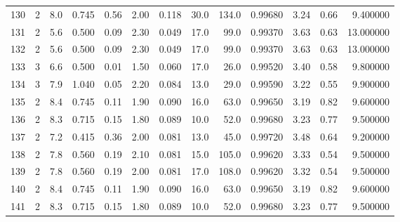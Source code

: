 \begin{tabular}{lrrrrrrrrrrrr}
130  &        2 &            8.0 &             0.745 &         0.56 &            2.00 &      0.118 &                 30.0 &                 134.0 &  0.99680 &  3.24 &       0.66 &   9.400000 \\
131  &        2 &            5.6 &             0.500 &         0.09 &            2.30 &      0.049 &                 17.0 &                  99.0 &  0.99370 &  3.63 &       0.63 &  13.000000 \\
132  &        2 &            5.6 &             0.500 &         0.09 &            2.30 &      0.049 &                 17.0 &                  99.0 &  0.99370 &  3.63 &       0.63 &  13.000000 \\
133  &        3 &            6.6 &             0.500 &         0.01 &            1.50 &      0.060 &                 17.0 &                  26.0 &  0.99520 &  3.40 &       0.58 &   9.800000 \\
134  &        3 &            7.9 &             1.040 &         0.05 &            2.20 &      0.084 &                 13.0 &                  29.0 &  0.99590 &  3.22 &       0.55 &   9.900000 \\
135  &        2 &            8.4 &             0.745 &         0.11 &            1.90 &      0.090 &                 16.0 &                  63.0 &  0.99650 &  3.19 &       0.82 &   9.600000 \\
136  &        2 &            8.3 &             0.715 &         0.15 &            1.80 &      0.089 &                 10.0 &                  52.0 &  0.99680 &  3.23 &       0.77 &   9.500000 \\
137  &        2 &            7.2 &             0.415 &         0.36 &            2.00 &      0.081 &                 13.0 &                  45.0 &  0.99720 &  3.48 &       0.64 &   9.200000 \\
138  &        2 &            7.8 &             0.560 &         0.19 &            2.10 &      0.081 &                 15.0 &                 105.0 &  0.99620 &  3.33 &       0.54 &   9.500000 \\
139  &        2 &            7.8 &             0.560 &         0.19 &            2.00 &      0.081 &                 17.0 &                 108.0 &  0.99620 &  3.32 &       0.54 &   9.500000 \\
140  &        2 &            8.4 &             0.745 &         0.11 &            1.90 &      0.090 &                 16.0 &                  63.0 &  0.99650 &  3.19 &       0.82 &   9.600000 \\
141  &        2 &            8.3 &             0.715 &         0.15 &            1.80 &      0.089 &                 10.0 &                  52.0 &  0.99680 &  3.23 &       0.77 &   9.500000 \\

\end{tabular}
